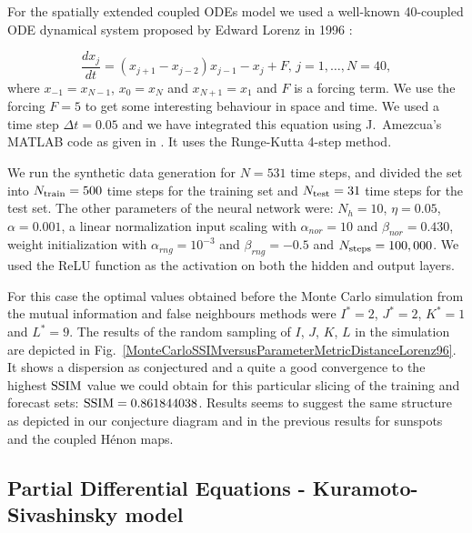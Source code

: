 \documentclass[journal]{IEEEtran}
\begin{document}
For the spatially extended coupled ODEs model we used a well-known 40-coupled ODE dynamical system proposed by Edward Lorenz in 1996 
\cite{articleLorenz96}:

\begin{equation}
\label{lorenz96equations}
\frac{dx_j}{dt}=\left( x_{j+1} - x_{j-2} \right ) x_{j-1} - x_j + F, \, j=1,\ldots,N=40,
\end{equation}
where $x_{-1}=x_{N-1}$, $x_0=x_N$ and $x_{N+1}=x_1$ and $F$ is a forcing term. 
We use the forcing $F=5$ to get some interesting behaviour in space and time. We used a time step $\Delta t=0.05$ and 
we have integrated this equation using J.\ Amezcua's MATLAB code as given in \cite{BibEntry2018Apr}. It uses the 
Runge-Kutta 4-step method.



We run the synthetic data generation for $N=531$ time steps, and divided the set into $N_{\textnormal{train}}=500$ time steps for the training set
and $N_{\textnormal{test}}=31$ time steps for the test set. The other parameters of the neural network were:
$N_h=10$, $\eta=0.05$, $\alpha=0.001$, a linear normalization input scaling with $\alpha_{nor} = 10$ and $\beta_{nor} = 0.430$, 
weight initialization with $\alpha_{rng} = 10^{-3}$ and $\beta_{rng} = -0.5$ and $N_{\textnormal{steps}}=100,000$. 
We used the ReLU function as the activation on both the hidden and output layers.

For this case the optimal values obtained before the Monte Carlo simulation from the mutual information and false neighbours methods 
were $I^*=2$, $J^*=2$, $K^*=1$ and $L^*=9$. The results of the random sampling of $I$, $J$, $K$, $L$ in the simulation
are depicted in Fig.\ \ref{MonteCarloSSIMversusParameterMetricDistanceLorenz96}.  It shows a dispersion as conjectured and a quite a good
convergence to the highest 
$\textnormal{SSIM}$ value we could obtain for this particular slicing of the training and forecast sets: $\textnormal{SSIM}=
0.861844038$. Results seems to suggest the same structure as depicted in our conjecture diagram and in the previous results for sunspots
and the coupled H\'{e}non maps.

\subsection{Partial Differential Equations - Kuramoto-Sivashinsky model}
\end{document}

